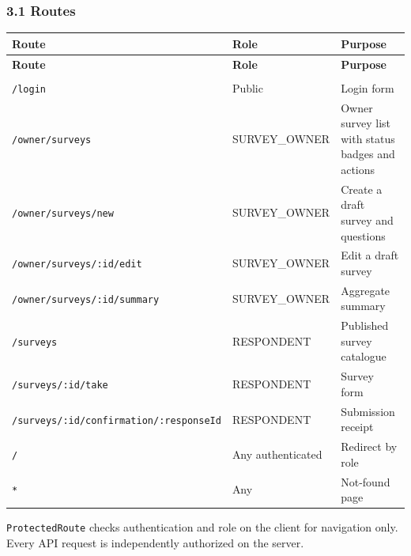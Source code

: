 \documentclass[12pt,a4paper]{article}
\begin{document}
\subsubsection*{3.1 Routes}
{\setlength{\tabcolsep}{3pt}\renewcommand{\arraystretch}{1.08}\small
\begin{longtable}{@{}>{\raggedright\arraybackslash}p{}>{\raggedright\arraybackslash}p{}>{\raggedright\arraybackslash}p{}@{}}
\toprule
\textbf{Route} & \textbf{Role} & \textbf{Purpose} \\
\midrule
\endfirsthead
\toprule
\textbf{Route} & \textbf{Role} & \textbf{Purpose} \\
\midrule
\endhead
\midrule
\multicolumn{3}{r}{\footnotesize\textit{Continued on next page}}\\
\endfoot
\bottomrule
\endlastfoot
\texttt{/login} & Public & Login form \\
\texttt{/owner/surveys} & SURVEY\_OWNER & Owner survey list with status badges and actions \\
\texttt{/owner/surveys/new} & SURVEY\_OWNER & Create a draft survey and questions \\
\texttt{/owner/surveys/:id/edit} & SURVEY\_OWNER & Edit a draft survey \\
\texttt{/owner/surveys/:id/summary} & SURVEY\_OWNER & Aggregate summary \\
\texttt{/surveys} & RESPONDENT & Published survey catalogue \\
\texttt{/surveys/:id/take} & RESPONDENT & Survey form \\
\texttt{/surveys/:id/confirmation/:responseId} & RESPONDENT & Submission receipt \\
\texttt{/} & Any authenticated & Redirect by role \\
\texttt{*} & Any & Not-found page \\
\end{longtable}}

\texttt{ProtectedRoute} checks authentication and role on the client for navigation only. Every API request is independently authorized on the server.

\end{document}
